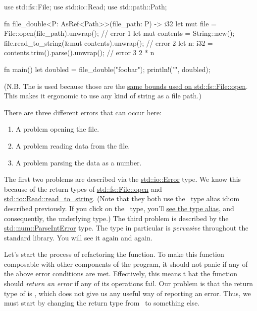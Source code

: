 \begin{rustc}
use std::fs::File;
use std::io::Read;
use std::path::Path;

fn file_double<P: AsRef<Path>>(file_path: P) -> i32 {
    let mut file = File::open(file_path).unwrap(); // error 1
    let mut contents = String::new();
    file.read_to_string(&mut contents).unwrap(); // error 2
    let n: i32 = contents.trim().parse().unwrap(); // error 3
    2 * n
}

fn main() {
    let doubled = file_double("foobar");
    println!("{}", doubled);
}
\end{rustc}

(N.B. The  is used because those are the 
\href{https://doc.rust-lang.org/std/fs/struct.File.html\#method.open}{same bounds used on std::fs::File::open}. This makes 
it ergonomic to use any kind of string as a file path.)

\blank

There are three different errors that can occur here:

\begin{enumerate}
  \item{A problem opening the file.}
  \item{A problem reading data from the file.}
  \item{A problem parsing the data as a number.}
\end{enumerate}

The first two problems are described via the \href{https://doc.rust-lang.org/std/io/struct.Error.html}{std::io::Error} type. 
We know this because of the return types of 
\href{https://doc.rust-lang.org/std/fs/struct.File.html\#method.open}{std::fs::File::open} and 
\href{https://doc.rust-lang.org/std/io/trait.Read.html\#method.read\_to\_string}{std::io::Read::read\_to\_string}. (Note that 
they both use the \result\ type alias idiom described previously. If you click on the \result\ type, you'll 
\href{https://doc.rust-lang.org/std/io/type.Result.html}{see the type alias}, and consequently, the underlying  
type.) The third problem is described by the 
\href{https://doc.rust-lang.org/std/num/struct.ParseIntError.html}{std::num::ParseIntError} type. The  type 
in particular is \emph{pervasive} throughout the standard library. You will see it again and again.

\blank

Let's start the process of refactoring the  function. To make this function composable with other 
components of the program, it should not panic if any of the above error conditions are met. Effectively, this means t
hat the function should \emph{return an error} if any of its operations fail. Our problem is that the return type of 
 is \itt, which does not give us any useful way of reporting an error. Thus, we must start by changing 
the return type from \itt\ to something else.

